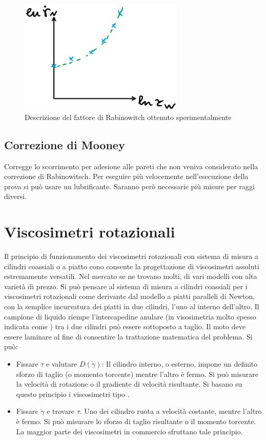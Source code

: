 \begin{figure}
\centering
\includegraphics[width = 0.7\textwidth]{gfx/CorrezioneDoppioLog}
\caption{Descrizione del fattore di Rabinowitch ottenuto sperimentalmente}
\label{fig:CorrezioneDoppioLog}
\end{figure}

\subsection{Correzione di Mooney}
Corregge lo scorrimento per adesione alle pareti che non veniva considerato nella correzione di Rabinowitsch.
Per eseguire più velocemente nell'esecuzione della prova si può usare un lubrificante. Saranno però necessarie più misure per raggi diversi.


\section{Viscosimetri rotazionali}
Il principio di funzionamento dei viscosimetri rotazionali con sistema di misura a cilindri coassiali o a piatto cono consente la progettazione di viscosimetri assoluti estremamente versatili.
Nel mercato se ne trovano molti, di vari modelli con alta varietà di prezzo.
Si può pensare al sistema di misura a cilindri coassiali per i viscosimetri rotazionali come derivante dal modello a piatti paralleli di Newton, con la semplice incurvatura dei piatti in due cilindri, l'uno al interno dell'altro. Il campione di liquido riempe l'intercapedine anulare (in visosimetria molto spesso indicata come ) tra i due cilindri può essere sottoposto a taglio. Il moto deve essere laminare al fine di consentire la trattazione matematica del problema.
Si può:
\begin{itemize}
\item Fissare $\tau$ e valutare $D(\dot{\gamma})$: Il cilindro interno, o esterno, impone un definito sforzo di taglio (o momento torcente) mentre l'altro è fermo.
Si può misurare la velocità di rotazione o il gradiente di velocità risultante. Si basano su questo principio i viscosimetri tipo .
\item Fissare $\dot{\gamma}$ e trovare $\tau$.
Uno dei cilindro ruota a velocità costante, mentre l'altro è fermo. Si può misurare lo sforzo di taglio risultante o il momento torcente. La maggior parte dei viscosimetri in commercio sfruttano tale principio.
\end{itemize}

